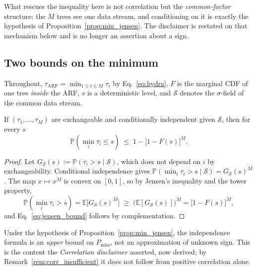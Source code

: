 What rescues the inequality here is not correlation but the \emph{common-factor} structure: the $M$
trees see one data stream, and conditioning on it is exactly the hypothesis of
Proposition~\ref{prop:min_jensen}. The disclaimer is restated on that mechanism below and is no
longer an assertion about a sign.

\subsection{Two bounds on the minimum}\label{sec:dep_bounds}

Throughout, $\tau_{\mathrm{ARF}} = \min_{1\le i\le M} \tau_i$ by Eq.~\eqref{eq:hydra}, $F$ is the
marginal CDF of one tree \emph{inside} the ARF, $s$ is a deterministic level, and $\mathcal{S}$
denotes the $\sigma$-field of the common data stream.

\begin{proposition}\label{prop:min_jensen}
  If $(\tau_1, \ldots, \tau_M)$ are exchangeable and conditionally independent given
  $\mathcal{S}$, then for every $s$
  \begin{equation}\label{eq:jensen_bound}
    \mathbb{P}\!\left(\min_i \tau_i \le s\right) \;\le\; 1 - \bigl[1 - F(s)\bigr]^M .
  \end{equation}
\end{proposition}

\begin{proof}
  Let $G_{\mathcal{S}}(s) := \mathbb{P}(\tau_i > s \mid \mathcal{S})$, which does not depend on $i$
  by exchangeability. Conditional independence gives
  $\mathbb{P}(\min_i \tau_i > s \mid \mathcal{S}) = G_{\mathcal{S}}(s)^M$. The map $x \mapsto x^M$
  is convex on $[0,1]$, so by Jensen's inequality and the tower property,
  \[
    \mathbb{P}\!\left(\min_i \tau_i > s\right) = \mathbb{E}\bigl[G_{\mathcal{S}}(s)^M\bigr]
      \;\ge\; \bigl(\mathbb{E}[G_{\mathcal{S}}(s)]\bigr)^M = \bigl[1 - F(s)\bigr]^M ,
  \]
  and Eq.~\eqref{eq:jensen_bound} follows by complementation.
\end{proof}

\begin{corollary}\label{cor:disclaimer}
  Under the hypothesis of Proposition~\ref{prop:min_jensen}, the independence formula is an
  \emph{upper} bound on $P_{\mathrm{miss}}$, not an approximation of unknown sign. This is the
  content the \emph{Correlation disclaimer} asserted, now derived; by
  Remark~\ref{rem:corr_insufficient} it does not follow from positive correlation alone.
\end{corollary}

